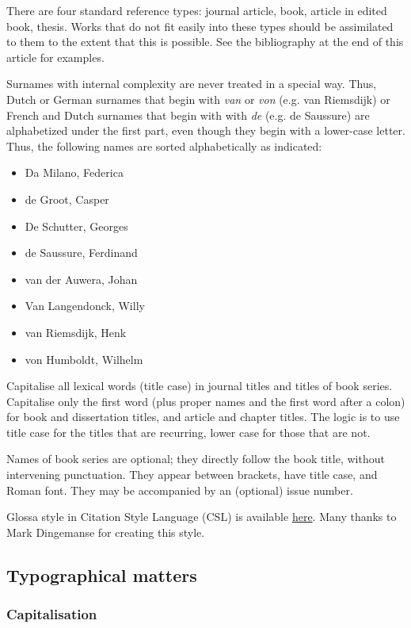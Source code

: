 \documentclass[charis,linguex,biblatex]{glossa}
\begin{document}
There are four standard reference types: journal article, book, article in edited book, thesis. Works that do not fit easily into these types should be assimilated to them to the extent that this is possible. See the bibliography at the end of this article for examples.

Surnames with internal complexity are never treated in a special way. Thus, Dutch or German surnames that begin with \textit{van} or \textit{von} (e.g. van Riemsdijk) or French and Dutch surnames that begin with with \textit{de} (e.g. de Saussure) are alphabetized under the first part, even though they begin with a lower-case letter. Thus, the following names are sorted alphabetically as indicated:

\begin{itemize}
\item Da Milano, Federica
\item de Groot, Casper
\item De Schutter, Georges
\item de Saussure, Ferdinand
\item van der Auwera, Johan
\item Van Langendonck, Willy
\item van Riemsdijk, Henk
\item von Humboldt, Wilhelm
\end{itemize}

Capitalise all lexical words (title case) in journal titles and titles of book series. Capitalise only the first word (plus proper names and the first word after a colon) for book and dissertation titles, and article and chapter titles. The logic is to use title case for the titles that are recurring, lower case for those that are not.

Names of book series are optional; they directly follow the book title, without intervening punctuation. They appear between brackets, have title case, and Roman font. They may be accompanied by an (optional) issue number.

Glossa style in Citation Style Language (CSL) is available \href{https://www.zotero.org/styles?q=Glossa}{here}. Many thanks to Mark Dingemanse for creating this style.


\subsection{Typographical matters}

\subsubsection{Capitalisation}
\end{document}
